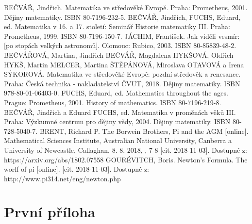\documentclass[rocnikovka]{gzwroc} %
\begin{document}
\begin{oldthebibliography}{99}
BEČVÁŘ, Jindřich. Matematika ve středověké Evropě. Praha: Prometheus, 2001. Dějiny matematiky. ISBN 80-7196-232-5.
BEČVÁŘ, Jindřich, FUCHS, Eduard, ed. Matematika v 16. a 17. století: Seminář Historie matematiky III. Praha: Prometheus, 1999. ISBN 80-7196-150-7.
JÁCHIM, František. Jak viděli vesmír: [po stopách velkých astronomů]. Olomouc: Rubico, 2003. ISBN 80-85839-48-2.
BEČVÁŘOVÁ, Martina, Jindřich BEČVÁŘ, Magdalena HYKŠOVÁ, Oldřich HYKŠ, Martin MELCER, Martina ŠTĚPÁNOVÁ, Miroslava OTAVOVÁ a Irena SÝKOROVÁ. Matematika ve středověké Evropě: pozdní středověk a renesance. Praha: Česká technika - nakladatelství ČVUT, 2018. Dějiny matematiky. ISBN 978-80-01-06403-0.
FUCHS, Eduard, ed. Mathematics throughout the ages. Prague: Prometheus, 2001. History of mathematics. ISBN 80-7196-219-8.
BEČVÁŘ, Jindřich a Eduard FUCHS, ed. Matematika v proměnách věků III. Praha: Výzkumné centrum pro dějiny vědy, 2004. Dějiny matematiky. ISBN 80-728-5040-7.
BRENT, Richard P. The Borwein Brothers, Pi and the AGM [online]. Mathematical Sciences Institute, Australian National University, Canberra a University of Newcastle, Callaghan, 8. 8. 2018, , 7-8 [cit. 2018-11-03]. Dostupné z: https://arxiv.org/abs/1802.07558
GOURÉVITCH, Boris. Newton's Formula. The worlf of pi [online]. [cit. 2018-11-03]. Dostupné z: http://www.pi314.net/eng/newton.php
\end{oldthebibliography}
\newpage
\listoffigures
\listoftables
\newpage
\prilohy
\section{První příloha} %
\end{document}
